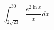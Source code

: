 \documentclass[letterpaper,12pt]{article}
\begin{document}
\[
\int_{2\sqrt{23}}^{30} \frac{e^{2\ln x}}{x}dx
\]
\end{document}
